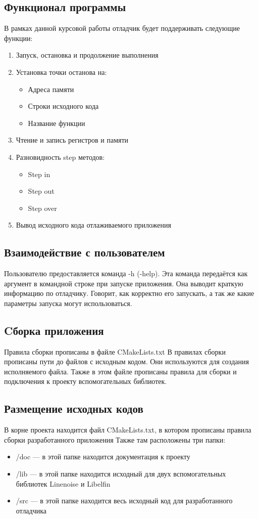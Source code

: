 \documentclass[oneside,final,14pt]{extreport}
\begin{document}
\subsection{Функционал программы}
В рамках данной курсовой работы отладчик будет поддерживать следующие функции: 
\begin{enumerate}
	\item Запуск, остановка и продолжение выполнения
	\item Установка точки останова на:
	\begin{itemize}
		\item Адреса памяти
		\item Строки исходного кода
		\item Название функции
	\end{itemize}
	\item Чтение и запись регистров и памяти
	\item Разновидность step методов:
	\begin{itemize}
		\item Step in
		\item Step out
		\item Step over
	\end{itemize}
    \item  Вывод исходного кода отлаживаемого приложения
\end{enumerate} 

\subsection{Взаимодействие с пользователем}
Пользователю предоставляется команда -h (-help). Эта команда передаётся как аргумент в командной строке при запуске приложения. Она выводит краткую информацию по отладчику. Говорит, как корректно его запускать, а так же какие параметры запуска могут использоваться.

\subsection{Cборка приложения}
Правила сборки прописаны в файле CMakeLists.txt
В правилах сборки прописаны пути до файлов с исходным кодом. Они используются для создания исполняемого файла.
Также в этом файле прописаны правила для сборки и подключения к проекту вспомогательных библиотек.

\subsection{Размещение исходных кодов}
В корне проекта находится файл CMakeLists.txt, в котором прописаны правила сборки разработанного приложения
Также там расположены три папки:
	\begin{itemize}
	\item /doc --- в этой папке находится документация к проекту
	\item /lib --- в этой папке находится исходный для двух вспомогательных библиотек Linenoise и Libelfin
	\item /src --- в этой папке находится весь исходный код для разработанного отладчика
\end{itemize}
\end{document}
